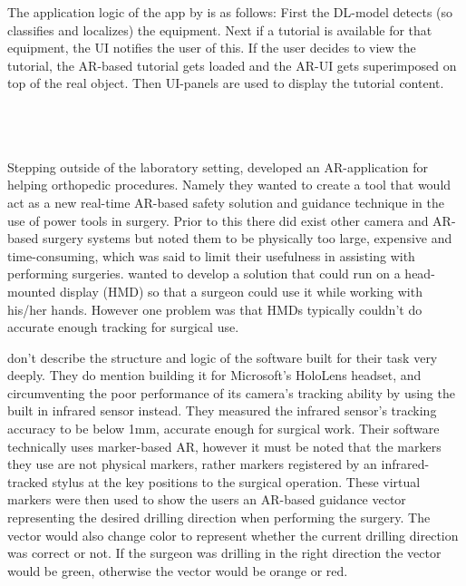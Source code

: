 	The application logic of the app by \textcite{estrada} is as follows: 
First the DL-model detects (so classifies and localizes) the equipment. Next 
if a tutorial is available for that equipment, the UI notifies the user of this.
If the user decides to view the tutorial, the AR-based tutorial gets loaded 
and the AR-UI gets superimposed on top of the real object. Then UI-panels are 
used to display the tutorial content. \par
\\
\\
\\
Stepping outside of the laboratory setting, \textcite{VanGestel2024} developed 
an AR-application for helping orthopedic procedures. Namely they wanted to 
create a tool that would act as a new real-time AR-based safety solution and 
guidance technique in the use of power tools in surgery. Prior to this there 
did exist other camera and AR-based surgery systems but 
\textcite{VanGestel2024} noted them to be physically too large, expensive and 
time-consuming, which was said to limit their usefulness in assisting with 
performing surgeries. \textcite{VanGestel2024} wanted to develop a solution 
that could run on a head-mounted display (HMD) so that a surgeon could use 
it while working with his/her hands. However one problem was that HMDs 
typically couldn't do accurate enough tracking for surgical 
use.\cite{VanGestel2024}\par
	\textcite{VanGestel2024} don't describe the structure and logic 
of the software built for their task very deeply. They do mention building it 
for Microsoft's HoloLens headset, and circumventing the poor performance of 
its camera's tracking ability by using the built in infrared sensor 
instead.\cite{VanGestel2024} They measured the infrared sensor's tracking 
accuracy to be below 1mm, accurate enough for surgical 
work.\cite{VanGestel2024} Their software technically uses marker-based AR, 
however it must be noted that the markers they use are not physical markers, 
rather markers registered by an infrared-tracked stylus at the key positions 
to the surgical operation.\cite{VanGestel2024} These virtual markers were then 
used to show the users an AR-based guidance vector representing the desired 
drilling direction when performing the surgery. The vector would also change 
color to represent whether the current drilling direction was correct or not. 
If the surgeon was drilling in the right direction the vector would be green, 
otherwise the vector would be orange or red.\cite{VanGestel2024}\par
